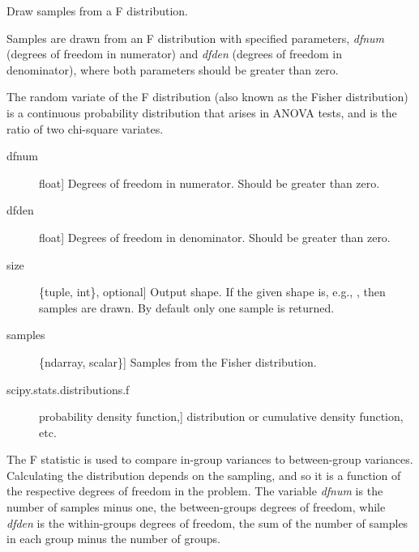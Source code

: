 \documentclass[letterpaper,10pt,english]{sphinxmanual}
\begin{document}
\begin{fulllineitems}
\label{pygeomod:pygeomod.geomodeller_xml_obj.f}
Draw samples from a F distribution.

Samples are drawn from an F distribution with specified parameters,
\emph{dfnum} (degrees of freedom in numerator) and \emph{dfden} (degrees of freedom
in denominator), where both parameters should be greater than zero.

The random variate of the F distribution (also known as the
Fisher distribution) is a continuous probability distribution
that arises in ANOVA tests, and is the ratio of two chi-square
variates.
\begin{description}
\item[{dfnum}] \leavevmode{[}float{]}
Degrees of freedom in numerator. Should be greater than zero.

\item[{dfden}] \leavevmode{[}float{]}
Degrees of freedom in denominator. Should be greater than zero.

\item[{size}] \leavevmode{[}\{tuple, int\}, optional{]}
Output shape.  If the given shape is, e.g., ,
then  samples are drawn. By default only one sample
is returned.

\end{description}
\begin{description}
\item[{samples}] \leavevmode{[}\{ndarray, scalar\}{]}
Samples from the Fisher distribution.

\end{description}
\begin{description}
\item[{scipy.stats.distributions.f}] \leavevmode{[}probability density function,{]}
distribution or cumulative density function, etc.

\end{description}

The F statistic is used to compare in-group variances to between-group
variances. Calculating the distribution depends on the sampling, and
so it is a function of the respective degrees of freedom in the
problem.  The variable \emph{dfnum} is the number of samples minus one, the
between-groups degrees of freedom, while \emph{dfden} is the within-groups
degrees of freedom, the sum of the number of samples in each group
minus the number of groups.


\end{fulllineitems}
\end{document}
